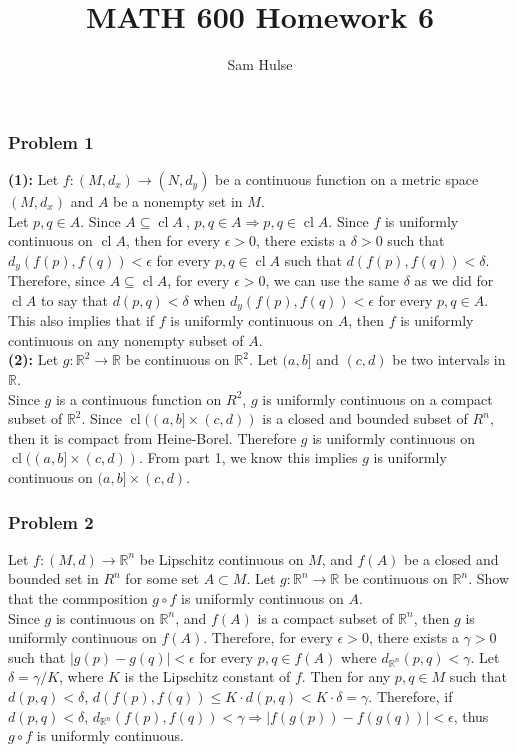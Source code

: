 \documentclass{article}
\title{MATH 600 Homework 6}
\author{Sam Hulse}
\DeclareMathOperator*{\cl}{cl}
\newcommand{\R}{\mathbb{R}}
\begin{document}
\maketitle

\subsubsection*{Problem 1}
\noindent \textbf{(1):} Let $f : (M, d_x) \rightarrow (N, d_y)$ be a continuous function on a metric space $(M, d_x)$ and $A$ be a nonempty set in $M$. \\

Let $p, q \in A$. Since $A \subseteq \cl A\ $, $p, q \in A \Rightarrow p, q \in \cl A$. Since $f$ is uniformly continuous on $\cl A$, then for every $\epsilon > 0$, there exists a $\delta > 0$ such that $d_y(f(p), f(q)) < \epsilon$ for every $p, q \in \cl A$ such that $d(f(p), f(q)) < \delta$. Therefore, since $A \subseteq \cl A$, for every $\epsilon > 0$, we can use the same $\delta$ as we did for $\cl A$ to say that $d(p, q) < \delta$ when $d_y(f(p), f(q)) < \epsilon$ for every $p, q \in A$. This also implies that if $f$ is uniformly continuous on $A$, then $f$ is uniformly continuous on any nonempty subset of $A$.\\

\noindent \textbf{(2):} Let $g: \R^2 \rightarrow \R$ be continuous on $\R^2$. Let $(a, b]$ and $(c, d)$ be two intervals in $\R$. \\

Since $g$ is a continuous function on $R^2$, $g$ is uniformly continuous on a compact subset of $\R^2$. Since $\cl ((a, b] \times (c, d))$ is a closed and bounded subset of $R^n$, then it is compact from Heine-Borel. Therefore $g$ is uniformly continuous on $\cl ((a, b] \times (c, d))$. From part 1, we know this implies $g$ is uniformly continuous on $(a, b] \times (c, d)$.

\subsubsection*{Problem 2}
Let $f: (M, d) \rightarrow \R^n$ be Lipschitz continuous on $M$, and $f(A)$ be a closed and bounded set in $R^n$ for some set $A \subset M$. Let $g: \R^n \rightarrow \R$ be continuous on $\R^n$. Show that the commposition $g \circ f$ is uniformly continuous on $A$.\\

Since $g$ is continuous on $\R^n$, and $f(A)$ is a compact subset of $\R^n$, then $g$ is uniformly continuous on $f(A)$. Therefore, for every $\epsilon > 0$, there exists a $\gamma > 0$ such that $|g(p) - g(q)| < \epsilon$ for every $p, q \in f(A)$ where $d_{\R^n}(p, q) < \gamma$. Let $\delta = \gamma / K$, where $K$ is the Lipschitz constant of $f$. Then for any $p, q \in M$ such that $d(p, q) < \delta$, $d(f(p), f(q)) \leq K \cdot d(p, q) < K \cdot \delta = \gamma$. Therefore, if $d(p, q) < \delta$, $d_{\R^n}(f(p), f(q)) < \gamma \Rightarrow |f(g(p)) - f(g(q))| < \epsilon$, thus $g \circ f$ is uniformly continuous.
\end{document}
